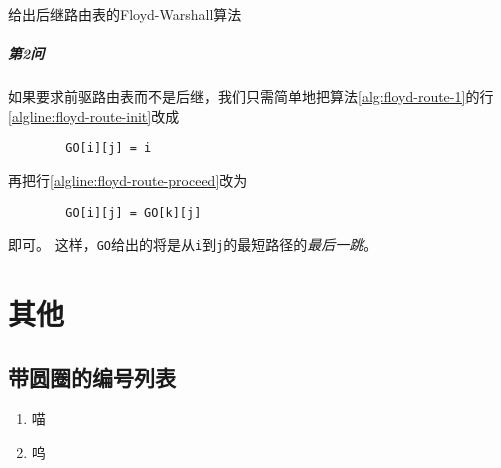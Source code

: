 \documentclass{dreamClass}
\begin{document}
\begin{algorithm}
    \caption{给出后继路由表的Floyd-Warshall算法}\label{alg:floyd-route-1}
    \Indm
    \Indp

     {
         {
             {
            }
        }
    }
\end{algorithm}
\subparagraph*{第2问}
如果要求前驱路由表而不是后继，我们只需简单地把算法\ref{alg:floyd-route-1}的行\ref{algline:floyd-route-init}改成
\begin{codeblock}
    \begin{verbatim}
        GO[i][j] = i
    \end{verbatim}
\end{codeblock}
再把行\ref{algline:floyd-route-proceed}改为
\begin{codeblock}
    \begin{verbatim}
        GO[i][j] = GO[k][j]
    \end{verbatim}
\end{codeblock}
即可。
这样，\texttt{GO}给出的将是从\texttt{i}到\texttt{j}的最短路径的\emph{最后一跳}。

\section{其他}
\subsection{带圆圈的编号列表}
\begin{enumerate}[label=\large\protect\textcircled{\small\arabic*}]
    \item 喵
    \item 呜
\end{enumerate}
\end{document}
